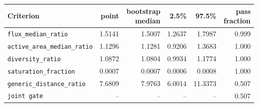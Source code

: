 \scriptsize
\setlength{\tabcolsep}{3pt}
\begin{tabular}{lrrrrr}
\toprule
Criterion & point & bootstrap median & 2.5\% & 97.5\% & pass fraction\\
\midrule
\texttt{flux\_median\_ratio} & 1.5141 & 1.5007 & 1.2637 & 1.7987 & 0.999\\
\texttt{active\_area\_median\_ratio} & 1.1296 & 1.1281 & 0.9206 & 1.3683 & 1.000\\
\texttt{diversity\_ratio} & 1.0872 & 1.0804 & 0.9934 & 1.1774 & 1.000\\
\texttt{saturation\_fraction} & 0.0007 & 0.0007 & 0.0006 & 0.0008 & 1.000\\
\texttt{generic\_distance\_ratio} & 7.6809 & 7.9763 & 6.0014 & 11.3373 & 0.507\\
\texttt{joint gate} & -- & -- & -- & -- & 0.507\\
\bottomrule
\end{tabular}
\normalsize
\setlength{\tabcolsep}{6pt}
